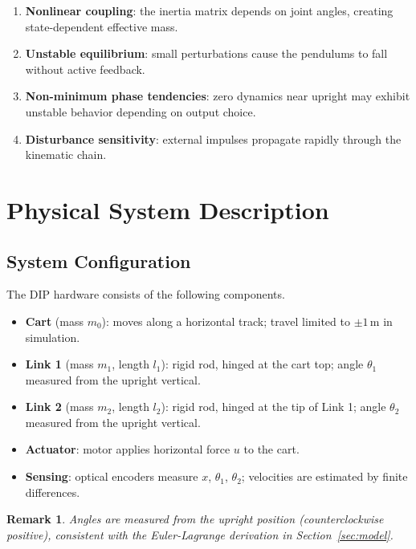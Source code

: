 \documentclass[11pt,a4paper]{article}
\newtheorem{remark}{Remark}[section]
\begin{document}
\begin{enumerate}
    \item \textbf{Nonlinear coupling}: the inertia matrix depends on joint
          angles, creating state-dependent effective mass.
    \item \textbf{Unstable equilibrium}: small perturbations cause the
          pendulums to fall without active feedback.
    \item \textbf{Non-minimum phase tendencies}: zero dynamics near upright may
          exhibit unstable behavior depending on output choice.
    \item \textbf{Disturbance sensitivity}: external impulses propagate rapidly
          through the kinematic chain.
\end{enumerate}

\section{Physical System Description}

\subsection{System Configuration}

The DIP hardware consists of the following components.

\begin{itemize}
    \item \textbf{Cart} (mass $m_0$): moves along a horizontal track;
          travel limited to $\pm 1\,\mathrm{m}$ in simulation.
    \item \textbf{Link 1} (mass $m_1$, length $l_1$): rigid rod, hinged at the
          cart top; angle $\theta_1$ measured from the upright vertical.
    \item \textbf{Link 2} (mass $m_2$, length $l_2$): rigid rod, hinged at the
          tip of Link 1; angle $\theta_2$ measured from the upright vertical.
    \item \textbf{Actuator}: motor applies horizontal force $u$ to the cart.
    \item \textbf{Sensing}: optical encoders measure $x$, $\theta_1$, $\theta_2$;
          velocities are estimated by finite differences.
\end{itemize}

\begin{remark}
Angles are measured from the upright position (counterclockwise positive),
consistent with the Euler-Lagrange derivation in
Section~\ref{sec:model}.
\end{remark}
\end{document}
